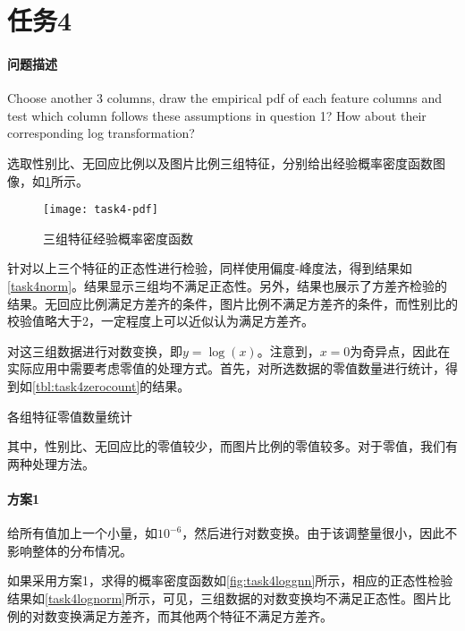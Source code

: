 \documentclass[a4paper,12pt]{article}
\begin{document}
    \section{任务4} %
    \paragraph{问题描述} Choose another 3 columns, draw the empirical pdf of each feature columns and test which column follows these assumptions in question 1? How about their corresponding log transformation?

    选取性别比、无回应比例以及图片比例三组特征，分别给出经验概率密度函数图像，如\cref{fig:gnn}所示。

    \begin{figure}[htbp]
        \centering
        \texttt{[image: task4-pdf]}
        \caption{三组特征经验概率密度函数}
        \label{fig:gnn}
    \end{figure}

    针对以上三个特征的正态性进行检验，同样使用偏度-峰度法，得到结果如\cref{task4norm}。结果显示三组均不满足正态性。另外，结果也展示了方差齐检验的结果。无回应比例满足方差齐的条件，图片比例不满足方差齐的条件，而性别比的校验值略大于2，一定程度上可以近似认为满足方差齐。
    

    对这三组数据进行对数变换，即$y=\log(x)$。注意到，$x=0$为奇异点，因此在实际应用中需要考虑零值的处理方式。首先，对所选数据的零值数量进行统计，得到如\cref{tbl:task4zerocount}的结果。

    \begin{table}[htbp]
      \centering
      \caption{各组特征零值数量统计}
      \label{tbl:task4zerocount}
      
    \end{table}

    其中，性别比、无回应比的零值较少，而图片比例的零值较多。对于零值，我们有两种处理方法。
    \paragraph{方案1} 给所有值加上一个小量，如$10^{-6}$，然后进行对数变换。由于该调整量很小，因此不影响整体的分布情况。

    如果采用方案1，求得的概率密度函数如\cref{fig:task4loggnn}所示，相应的正态性检验结果如\cref{task4lognorm}所示，可见，三组数据的对数变换均不满足正态性。图片比例的对数变换满足方差齐，而其他两个特征不满足方差齐。
\end{document}
